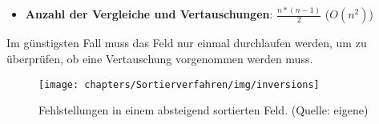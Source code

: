 \begin{itemize}
    \item \textbf{Anzahl der Vergleiche und Vertauschungen}: $\frac{n * ( n - 1)}{2}$ ($O(n^2)$)
\end{itemize}


\noindent
Im günstigsten Fall muss das Feld nur einmal durchlaufen werden, um zu überprüfen, ob eine Vertauschung vorgenommen werden muss.\\


\begin{figure}
    \begin{center}
        \texttt{[image: chapters/Sortierverfahren/img/inversions]}
        \caption{Fehlstellungen in einem absteigend sortierten Feld. (Quelle: eigene)}
        \label{fig:inversions}
    \end{center}
\end{figure}